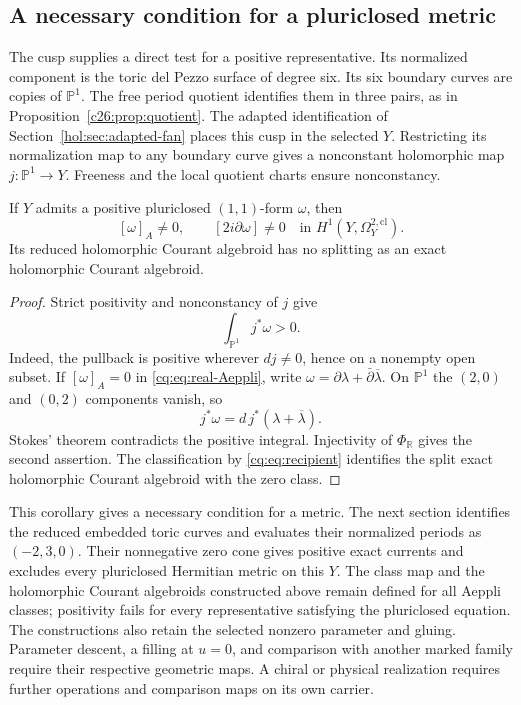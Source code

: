 \subsection{A necessary condition for a pluriclosed metric}

The cusp supplies a direct test for a positive representative.
Its normalized component is the toric del Pezzo surface of degree
six. Its six boundary curves are copies of $\mathbb P^1$.
The free period quotient identifies them in three pairs, as in
Proposition~\ref{c26:prop:quotient}.
The adapted identification of Section~\ref{hol:sec:adapted-fan}
places this cusp in the selected $Y$.
Restricting its normalization map to any boundary curve gives
a nonconstant holomorphic map
$j:\mathbb P^1\to Y$.
Freeness and the local quotient charts ensure nonconstancy.

\begin{corollary}\label{cq:cor:positive-class}
If $Y$ admits a positive pluriclosed $(1,1)$-form $\omega$, then
\[
             [\omega]_A\ne0,\qquad
             [2i\partial\omega]\ne0
                    \quad\text{in }H^1(Y,\Omega_Y^{2,\mathrm{cl}}).
\]
Its reduced holomorphic Courant algebroid has no splitting
as an exact holomorphic Courant algebroid.
\end{corollary}

\begin{proof}
Strict positivity and nonconstancy of $j$ give
\[
                            \int_{\mathbb P^1}j^*\omega>0.
\]
Indeed, the pullback is positive wherever $dj\ne0$, hence on
a nonempty open subset.
If $[\omega]_A=0$ in \eqref{cq:eq:real-Aeppli}, write
$\omega=\partial\lambda+\bar\partial\overline\lambda$.
On $\mathbb P^1$ the $(2,0)$ and $(0,2)$ components vanish, so
\[
                  j^*\omega=d\,j^*(\lambda+\overline\lambda).
\]
Stokes' theorem contradicts the positive integral.
Injectivity of $\Phi_{\mathbb R}$ gives the second assertion.
The classification by \eqref{cq:eq:recipient} identifies the
split exact holomorphic Courant algebroid with the zero class.
\end{proof}

This corollary gives a necessary condition for a metric.
The next section identifies the reduced embedded toric curves
and evaluates their normalized periods as $(-2,3,0)$.
Their nonnegative zero cone gives positive exact currents and
excludes every pluriclosed Hermitian metric on this $Y$.
The class map and the holomorphic Courant algebroids constructed
above remain defined for all Aeppli classes; positivity fails
for every representative satisfying the pluriclosed equation.
The constructions also retain the selected nonzero parameter
and gluing. Parameter descent, a filling at $u=0$, and comparison
with another marked family require their respective geometric maps.
A chiral or physical realization requires further operations
and comparison maps on its own carrier.
